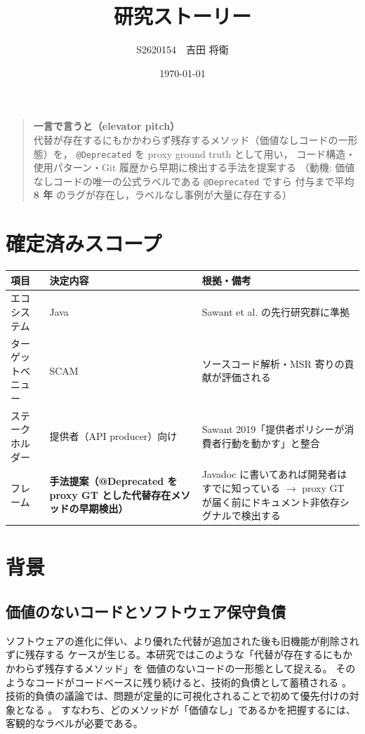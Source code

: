 \documentclass[a4paper,12pt]{article}
\title{研究ストーリー}
\author{S2620154　吉田 将衛}
\date{\today}
\begin{document}
\maketitle

\begin{quote}
  \textbf{一言で言うと（elevator pitch）}\\
  代替が存在するにもかかわらず残存するメソッド（価値なしコードの一形態）を，
  \texttt{@Deprecated} を proxy ground truth として用い，
  コード構造・使用パターン・Git 履歴から早期に検出する手法を提案する
  （動機: 価値なしコードの唯一の公式ラベルである \texttt{@Deprecated} ですら
  付与まで平均 \textbf{8 年} のラグが存在し，ラベルなし事例が大量に存在する）
\end{quote}

\section*{確定済みスコープ}

\begin{tabular}{|p{3.5cm}|p{4.5cm}|p{6cm}|}
  \hline
  \textbf{項目} & \textbf{決定内容} & \textbf{根拠・備考} \\
  \hline
  エコシステム & Java & Sawant et al. の先行研究群に準拠 \\
  \hline
  ターゲットベニュー & SCAM & ソースコード解析・MSR 寄りの貢献が評価される \\
  \hline
  ステークホルダー & 提供者（API producer）向け & Sawant 2019「提供者ポリシーが消費者行動を動かす」と整合 \\
  \hline
  フレーム & \textbf{手法提案（@Deprecated を proxy GT とした代替存在メソッドの早期検出）} & Javadoc に書いてあれば開発者はすでに知っている $\rightarrow$ proxy GT が届く前にドキュメント非依存シグナルで検出する \\
  \hline
\end{tabular}

\section{背景}

\subsection*{価値のないコードとソフトウェア保守負債}

ソフトウェアの進化に伴い、より優れた代替が追加された後も旧機能が削除されずに残存する
ケースが生じる。本研究ではこのような「代替が存在するにもかかわらず残存するメソッド」を
価値のないコードの一形態として捉える。
そのようなコードがコードベースに残り続けると、技術的負債として蓄積される
。
技術的負債の議論では、問題が定量的に可視化されることで初めて優先付けの対象となる
。
すなわち、どのメソッドが「価値なし」であるかを把握するには、客観的なラベルが必要である。
\end{document}
